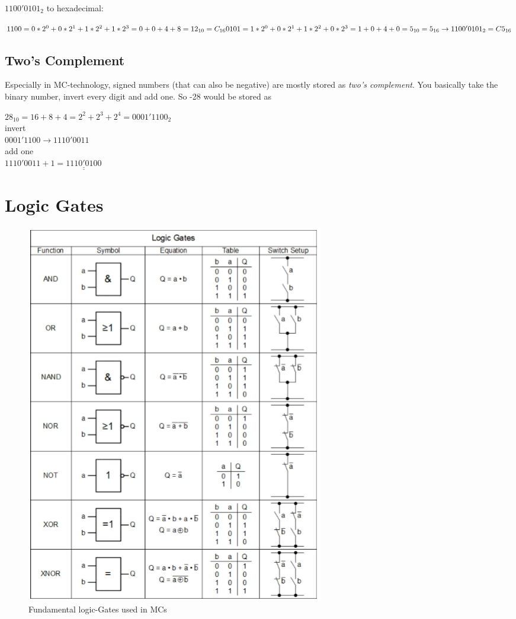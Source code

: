 \documentclass[a4paper, 11pt, nofootinbib]{article}
\begin{document}
\noindent $1100'0101_{2}$ to hexadecimal:
\vspace{10px}

\noindent
$1100 = 0*2^0 + 0* 2^1 + 1*2^2 + 1*2^3 = 0 + 0 + 4 + 8 = 12_{10} = C_{16} \\
0101 = 1 * 2^0 + 0*2^1  + 1*2^2 + 0*2^3 = 1 + 0 + 4 + 0 = 5_{10} = 5_{16} \\
\rightarrow 1100'0101_{2} = C5_{16}
$

\subsection{Two's Complement}
Especially in MC-technology, signed numbers (that can also be negative) are mostly stored as \textit{two's complement}. You basically take the binary number, invert every digit and add one. So -28 would be stored as
\vspace{10px}

\noindent
$ 28_{10} = 16 + 8 + 4 = 2^2 + 2^3 + 2^4 = 0001'1100_{2}$ \\
invert \\
$ 0001'1100 \rightarrow 1110'0011$\\
add one \\
$1110'0011 + 1 = \underline{\underline{1110'0100}}$

\newpage

\section{Logic Gates}
\begin{figure}[htb]
	\centering
	\includegraphics[keepaspectratio=true,height=22\baselineskip]{logicGates.PNG}
	\caption{Fundamental logic-Gates used in MCs}
	\label{fig:logicGates}
\end{figure}
\end{document}
